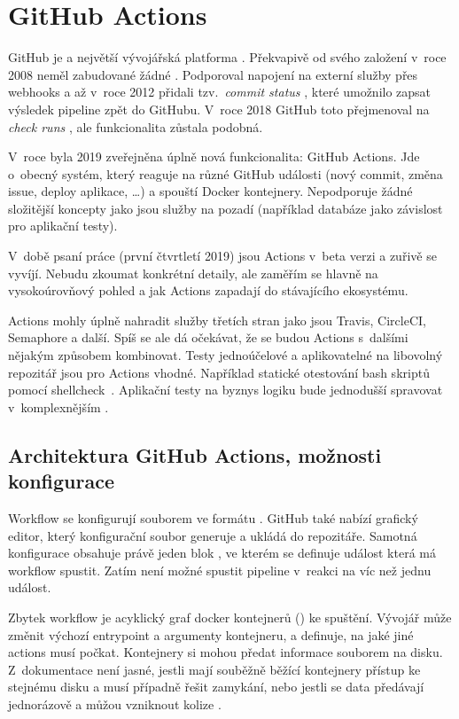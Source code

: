 \section{GitHub Actions}
    GitHub je  a největší vývojářská platforma \cite{github-about}. Překvapivě od svého založení v~roce 2008 neměl zabudované žádné \CI. Podporoval napojení na externí služby přes webhooks a až v~roce 2012 přidali tzv.~\textit{commit status }, které umožnilo \CI zapsat výsledek pipeline zpět do GitHubu. V~roce 2018 GitHub toto přejmenoval na \textit{check runs }, ale funkcionalita zůstala podobná.

    V~roce byla 2019 zveřejněna úplně nová funkcionalita: GitHub Actions. Jde o~obecný systém, který reaguje na různé GitHub události (nový commit, změna issue, deploy aplikace, \ldots) a spouští Docker kontejnery. Nepodporuje žádné složitější koncepty jako jsou služby na pozadí (například databáze jako závislost pro aplikační testy).

    V~době psaní práce (první čtvrtletí 2019) jsou Actions v~beta verzi a zuřivě se vyvíjí. Nebudu zkoumat konkrétní detaily, ale zaměřím se hlavně na vysokoúrovňový pohled a jak Actions zapadají do stávajícího ekosystému.

    Actions mohly úplně nahradit služby třetích stran jako jsou Travis, CircleCI, Semaphore a další. Spíš se ale dá očekávat, že se budou Actions s~dalšími \CI nějakým způsobem kombinovat. Testy jednoúčelové a aplikovatelné na libovolný repozitář jsou pro Actions vhodné. Například statické otestování bash skriptů pomocí shellcheck~\cite{ga-shellcheck}. Aplikační testy na byznys logiku bude jednodušší spravovat v~komplexnějším \CI.

    \subsection{Architektura GitHub Actions, možnosti konfigurace}
        Workflow se konfigurují souborem  ve formátu . GitHub také nabízí grafický editor, který konfigurační soubor generuje a ukládá do repozitáře. Samotná konfigurace obsahuje právě jeden blok , ve kterém se definuje  událost která má workflow spustit. Zatím není možné spustit pipeline v~reakci na víc než jednu událost.

        Zbytek workflow je acyklický graf docker kontejnerů () ke spuštění. Vývojář může změnit výchozí entrypoint a argumenty kontejneru, a definuje, na jaké jiné actions musí počkat. Kontejnery si mohou předat informace souborem na disku. Z~dokumentace není jasné, jestli mají souběžně běžící kontejnery přístup ke stejnému disku a musí případně řešit zamykání, nebo jestli se data předávají jednorázově a můžou vzniknout kolize \cite{ga-fs}.

